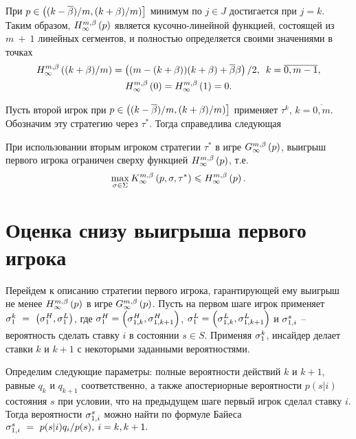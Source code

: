 При $p \in \left( (k-\DCo)/m, (k+\Co)/m) \right]$ минимум по $j \in J$
достигается при $j = k$. Таким образом, $\upperBound{p}$ является
кусочно-линейной функцией, состоящей из $m~+~1$ линейных сегментов, и полностью
определяется своими значениями в точках
\begin{gather*}
  \upperBound{(k+\Co)/m} = \left( (m - (k + \Co))(k + \Co) + \DCo\Co
  \right) / 2, \enskip
  k = \overline{0, m - 1},\\
  \upperBound{0} = \upperBound{1} = 0.
\end{gather*}

Пусть второй игрок при $p \in \left( (k-\DCo)/m, (k+\Co)/m) \right]$
применяет $\tau^k, \, k = \overline{0, m}$. Обозначим эту стратегию через
$\tau^*$. Тогда справедлива следующая

\begin{lemma}
  \label{lemma:upperBound}
  При использовании вторым игроком стратегии $\tau^*$ в игре
  $\infiniteGame{p}$\textup{,} выигрыш первого игрока ограничен сверху функцией
  $\upperBound{p}$, т.е.
  \[
    \max_{\sigma \in \Sigma} \infiniteFirstPlayerPayoff{p}{\sigma}{\tau^*} \leq
    \upperBound{p}.
  \]
\end{lemma}

\section{Оценка снизу выигрыша первого игрока}
Перейдем к описанию стратегии первого игрока, гарантирующей ему выигрыш не менее
$\upperBound{p}$ в игре $\infiniteGame{p}$. Пусть на первом шаге игрок применяет
$ \fGeneral{k}~=~\left(\fGeneral{H}, \fGeneral{L}\right) $, где $\fGeneral{H} =
\left(\fGeneral[1,k]{H}, \fGeneral[1,k+1]{H}\right)$, $\fGeneral{L} =
\left(\fGeneral[1,k]{L}, \fGeneral[1,k+1]{L}\right)$ и $\fGeneral[1,i]{s}$ --
вероятность сделать ставку $i$ в состоянии $s \in S$. Применяя
$\fGeneral{k}$, инсайдер делает ставки $k$ и $k+1$ с некоторыми заданными
вероятностями.

Определим следующие параметры: полные вероятности действий $k$ и $k+1$, равные
$q_k$ и $q_{k+1}$ соответственно, а также апостериорные вероятности $p(s|i)$
состояния $s$ при условии, что на предыдущем шаге первый игрок сделал ставку
$i$. Тогда вероятности $\fGeneral[1,i]{s}$ можно найти по формуле Байеса $
\fGeneral[1,i]{s}~=~p(s|i)q_i/p(s), \: i = k, k + 1. $

